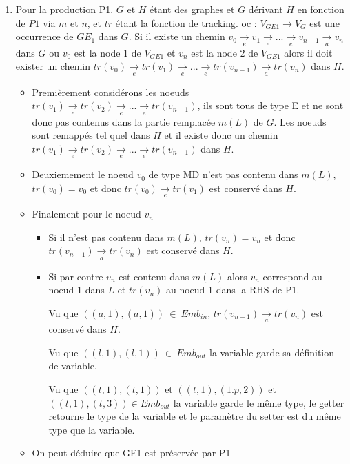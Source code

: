 \documentclass[a4paper, 12pt]{article}
\begin{document}
  \begin{enumerate}
    \item

    Pour la production P1. $G$ et $H$ étant des graphes et $G$ dérivant $H$ en fonction de $P1$ via $m$ et $n$, et $tr$ étant la fonction de tracking. oc :  \( {V_{GE1}} {\rightarrow} {V_G} \) est une occurrence de  {$GE_1$} dans $G$.
    Si il existe un chemin \( v_0 \underset{e}{\rightarrow} v_1 \underset{e}{\rightarrow} ... \underset{e}{\rightarrow} v_{n-1} \underset{a}{\rightarrow} v_n \) dans $G$
    ou $v_0$ est la node 1 de $V_{GE1}$ et {$v_n$} est la node 2 de $V_{GE1}$
    alors il doit exister un chemin \( tr(v_0) \underset{e}{\rightarrow} tr(v_1) \underset{e}{\rightarrow} ... \underset{e}{\rightarrow} tr(v_{n-1}) \underset{a}{\rightarrow} tr({v_n}) \) dans $H$.
    \begin{itemize}[label=\textbullet]
      \item Premièrement considérons les noeuds $tr(v_1) \underset{e}{\rightarrow} tr(v_2) \underset{e}{\rightarrow} ... \underset{e}{\rightarrow} tr(v_{n-1})$,
      ils sont tous de type E et ne sont donc pas contenus dans la partie remplacée $m(L)$ de $G$.
      Les noeuds sont remappés tel quel dans $H$ et il existe donc un chemin $tr(v_1) \underset{e}{\rightarrow} tr(v_2) \underset{e}{\rightarrow} ... \underset{e}{\rightarrow} tr(v_{n-1})$ dans $H$.

      \item Deuxiemement le noeud $v_0$ de type MD n'est pas contenu dans $m(L)$, $tr(v_0) = v_0$ et donc $tr(v_0) \underset{e}{\rightarrow} tr(v_1)$ est conservé dans $H$.

      \item Finalement pour le noeud {$v_n$}
      \begin{itemize}
      \item Si il n'est pas contenu dans $m(L)$, $tr(v_n)= v_n$ et donc $tr(v_{n-1}) \underset{a}{\rightarrow} tr(v_n)$ est conservé dans $H$.
      \item Si par contre $v_n$ est contenu dans $m(L)$ alors $v_n$ correspond au noeud 1 dans $L$ et $tr(v_n)$ au noeud 1 dans la RHS de P1.

      Vu que $((a,1),(a,1))~\in~Emb_{in}$, $tr(v_{n-1}) \underset{a}{\rightarrow} tr(v_n)$ est conservé dans $H$.

      Vu que $((l,1),(l,1))~\in~Emb_{out}$ la variable garde sa définition de variable.

      Vu que $((t,1),(t,1))$ et $((t,1),(1.p,2))$ et $((t,1),(t,3)) \in Emb_{out}$ la variable garde le même type, le getter retourne le type de la variable et le paramètre du setter est
      du même type que la variable.
    \end{itemize}
    \item On peut déduire que GE1 est préservée par P1
    \end{itemize}


\end{enumerate}
\end{document}
